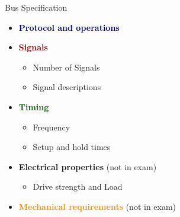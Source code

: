 \begin{concept}{Bus Specification}
    \begin{itemize}
        \item \textcolor{darkblue}{\textbf{Protocol and operations}}
        \item \textcolor{darkred}{\textbf{Signals}}
        \begin{itemize}
            \item Number of Signals
            \item Signal descriptions
        \end{itemize}
        \item \textcolor{darkgreen}{\textbf{Timing}}
        \begin{itemize}
            \item Frequency
            \item Setup and hold times
        \end{itemize}
        \item \textcolor{darkpurple}{\textbf{Electrical properties}} (not in exam)
        \begin{itemize}
            \item Drive strength and Load
        \end{itemize}
        \item \textcolor{darkorange}{\textbf{Mechanical requirements}} (not in exam)
    \end{itemize}
\end{concept}

\columnbreak

